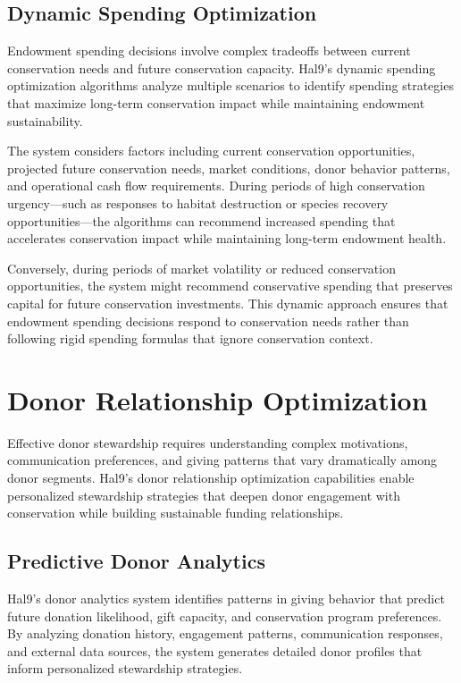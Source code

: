 \documentclass[
  Letterpaper,
]{scrbook}
\begin{document}
\subsection{Dynamic Spending
Optimization}\label{dynamic-spending-optimization}

Endowment spending decisions involve complex tradeoffs between current
conservation needs and future conservation capacity. Hal9's dynamic
spending optimization algorithms analyze multiple scenarios to identify
spending strategies that maximize long-term conservation impact while
maintaining endowment sustainability.

The system considers factors including current conservation
opportunities, projected future conservation needs, market conditions,
donor behavior patterns, and operational cash flow requirements. During
periods of high conservation urgency---such as responses to habitat
destruction or species recovery opportunities---the algorithms can
recommend increased spending that accelerates conservation impact while
maintaining long-term endowment health.

Conversely, during periods of market volatility or reduced conservation
opportunities, the system might recommend conservative spending that
preserves capital for future conservation investments. This dynamic
approach ensures that endowment spending decisions respond to
conservation needs rather than following rigid spending formulas that
ignore conservation context.

\section{Donor Relationship
Optimization}\label{donor-relationship-optimization}

Effective donor stewardship requires understanding complex motivations,
communication preferences, and giving patterns that vary dramatically
among donor segments. Hal9's donor relationship optimization
capabilities enable personalized stewardship strategies that deepen
donor engagement with conservation while building sustainable funding
relationships.

\subsection{Predictive Donor
Analytics}\label{predictive-donor-analytics}

Hal9's donor analytics system identifies patterns in giving behavior
that predict future donation likelihood, gift capacity, and conservation
program preferences. By analyzing donation history, engagement patterns,
communication responses, and external data sources, the system generates
detailed donor profiles that inform personalized stewardship strategies.
\end{document}
